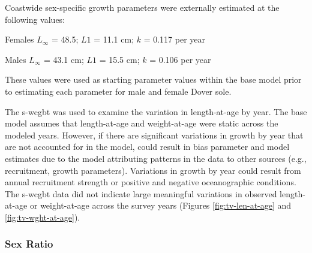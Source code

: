 \documentclass[11pt,
  english,
  a4paper,
]{article}
\begin{document}
\leavevmode\tagmcend\tagstructend\par


Coastwide sex-specific growth parameters were externally estimated at the following values:

\leavevmode\tagmcend\tagstructend\par

\begin{centering}

Females $L_{\infty}$ = 48.5; $L1$ = 11.1 cm; $k$ = 0.117 per year

Males $L_{\infty}$ = 43.1 cm; $L1$ = 15.5 cm; $k$ = 0.106 per year

\end{centering}


These values were used as starting parameter values within the base model prior to estimating each parameter for male and female Dover sole.

\leavevmode\tagmcend\tagstructend\par


The \gls{s-wcgbt} was used to examine the variation in length-at-age by year. The base model assumes that length-at-age and weight-at-age were static across the modeled years. However, if there are significant variations in growth by year that are not accounted for in the model, could result in bias parameter and model estimates due to the model attributing patterns in the data to other sources (e.g., recruitment, growth parameters). Variations in growth by year could result from annual recruitment strength or positive and negative oceanographic conditions. The \gls{s-wcgbt} data did not indicate large meaningful variations in observed length-at-age or weight-at-age across the survey years (Figures \ref{fig:tv-len-at-age} and \ref{fig:tv-wght-at-age}).

\leavevmode\tagmcend\tagstructend\par


\hypertarget{sex-ratio}{%
\subsubsection{Sex Ratio}\label{sex-ratio}}
\end{document}
